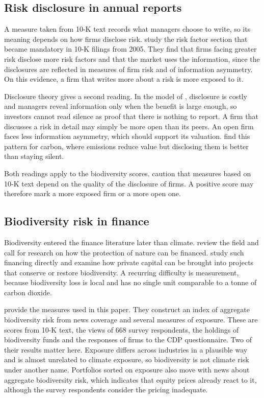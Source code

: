 \documentclass[12pt,a4paper]{article}
\begin{document}
\subsection{Risk disclosure in annual reports}

A measure taken from 10-K text records what managers choose to write, so its meaning depends on how firms disclose risk. \citet{campbell2014} study the risk factor section that became mandatory in 10-K filings from 2005. They find that firms facing greater risk disclose more risk factors and that the market uses the information, since the disclosures are reflected in measures of firm risk and of information asymmetry. On this evidence, a firm that writes more about a risk is more exposed to it.

Disclosure theory gives a second reading. In the model of \citet{verrecchia1983}, disclosure is costly and managers reveal information only when the benefit is large enough, so investors cannot read silence as proof that there is nothing to report. A firm that discusses a risk in detail may simply be more open than its peers. An open firm faces less information asymmetry, which should support its valuation. \citet{matsumura2014} find this pattern for carbon, where emissions reduce value but disclosing them is better than staying silent.

Both readings apply to the biodiversity scores. \citet{giglio2026} caution that measures based on 10-K text depend on the quality of the disclosure of firms. A positive score may therefore mark a more exposed firm or a more open one.

\subsection{Biodiversity risk in finance}

Biodiversity entered the finance literature later than climate. \citet{karolyi2023} review the field and call for research on how the protection of nature can be financed. \citet{flammer2025} study such financing directly and examine how private capital can be brought into projects that conserve or restore biodiversity. A recurring difficulty is measurement, because biodiversity loss is local and has no single unit comparable to a tonne of carbon dioxide.

\citet{giglio2026} provide the measures used in this paper. They construct an index of aggregate biodiversity risk from news coverage and several measures of exposure. These are scores from 10-K text, the views of 668 survey respondents, the holdings of biodiversity funds and the responses of firms to the CDP questionnaire. Two of their results matter here. Exposure differs across industries in a plausible way and is almost unrelated to climate exposure, so biodiversity is not climate risk under another name. Portfolios sorted on exposure also move with news about aggregate biodiversity risk, which indicates that equity prices already react to it, although the survey respondents consider the pricing inadequate.
\end{document}
